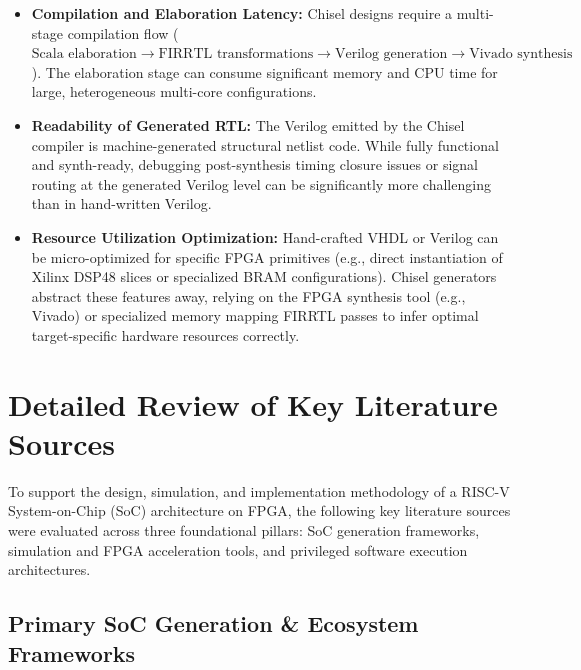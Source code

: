 \documentclass[12pt,a4paper]{article}
\begin{document}
\begin{itemize}
    \item \textbf{Compilation and Elaboration Latency:} Chisel designs require a multi-stage compilation flow ($\text{Scala elaboration} \rightarrow \text{FIRRTL transformations} \rightarrow \text{Verilog generation} \rightarrow \text{Vivado synthesis}$). The elaboration stage can consume significant memory and CPU time for large, heterogeneous multi-core configurations.
    \item \textbf{Readability of Generated RTL:} The Verilog emitted by the Chisel compiler is machine-generated structural netlist code. While fully functional and synth-ready, debugging post-synthesis timing closure issues or signal routing at the generated Verilog level can be significantly more challenging than in hand-written Verilog.
    \item \textbf{Resource Utilization Optimization:} Hand-crafted VHDL or Verilog can be micro-optimized for specific FPGA primitives (e.g., direct instantiation of Xilinx DSP48 slices or specialized BRAM configurations). Chisel generators abstract these features away, relying on the FPGA synthesis tool (e.g., Vivado) or specialized memory mapping FIRRTL passes to infer optimal target-specific hardware resources correctly.
\end{itemize}

\section{Detailed Review of Key Literature Sources}

To support the design, simulation, and implementation methodology of a RISC-V System-on-Chip (SoC) architecture on FPGA, the following key literature sources were evaluated across three foundational pillars: SoC generation frameworks, simulation and FPGA acceleration tools, and privileged software execution architectures.

\subsection{Primary SoC Generation \& Ecosystem Frameworks}
\end{document}
